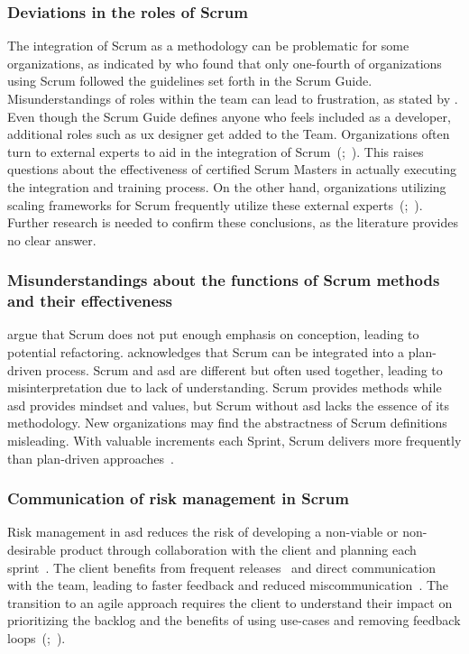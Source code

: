 \subsubsection*{Deviations in the roles of Scrum}\label{subsubsec:DeviationOfRoles}
The integration of Scrum as a \gls{methodology} can be problematic for some organizations, as indicated by  who found that only one-fourth of organizations using Scrum followed the \glspl{guideline} set forth in the Scrum Guide. Misunderstandings of roles within the team can lead to frustration, as stated by . Even though the Scrum Guide defines anyone who feels included as a \gls{developer}, additional roles such as \ac{ux} designer get added to the Team. Organizations often turn to external experts to aid in the integration of Scrum~(;~). This raises questions about the effectiveness of certified Scrum Masters in actually executing the integration and training process. On the other hand, organizations utilizing scaling \glspl{framework} for Scrum frequently utilize these external experts~(;~). Further research is needed to confirm these conclusions, as the literature provides no clear answer.

\subsubsection*{Misunderstandings about the functions of Scrum methods and their effectiveness}\label{subsubsec:MisunderstandingsOfScrum}
 argue that Scrum does not put enough emphasis on conception, leading to potential refactoring.  acknowledges that Scrum can be integrated into a \gls{plan-driven} process. Scrum and \ac{asd} are different but often used together, leading to misinterpretation due to lack of understanding. Scrum provides \glspl{method} while \ac{asd} provides \gls{mindset} and values, but Scrum without \ac{asd} lacks the essence of its \gls{methodology}. New organizations may find the abstractness of Scrum definitions misleading. With valuable increments each Sprint, Scrum delivers more frequently than \gls{plan-driven} approaches~\cite[p.~34]{Rubin2012ESA}.

\subsubsection*{Communication of risk management in Scrum}\label{subsubsec:RiskManagementInScrum}
Risk management in \ac{asd} reduces the risk of developing a non-viable or non-desirable product through collaboration with the \gls{client} and planning each sprint~\cite[p.~18]{battoia2019innovation}. The \gls{client} benefits from frequent releases~\cite[p.~4]{RachevaCpi} and direct communication with the team, leading to faster feedback and reduced miscommunication~\cite[p.~193]{Cho2008IAC}. The \gls{transition} to an \gls{agile} approach requires the \gls{client} to understand their impact on prioritizing the backlog and the benefits of using use-cases and removing feedback loops~(;~). 

